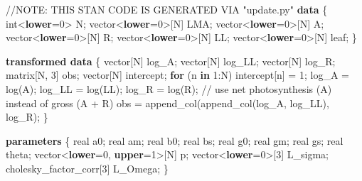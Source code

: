 \documentclass[
  12pt,
  letterpaper,
  DIV=11,
  numbers=noendperiod]{scrartcl}
\newenvironment{Shaded}{\begin{snugshade}}{\end{snugshade}}
\newcommand{\AlertTok}[1]{\textcolor[rgb]{0.68,0.00,0.00}{#1}}
\newcommand{\CommentTok}[1]{\textcolor[rgb]{0.37,0.37,0.37}{#1}}
\newcommand{\ControlFlowTok}[1]{\textcolor[rgb]{0.00,0.23,0.31}{\textbf{#1}}}
\newcommand{\DataTypeTok}[1]{\textcolor[rgb]{0.68,0.00,0.00}{#1}}
\newcommand{\DecValTok}[1]{\textcolor[rgb]{0.68,0.00,0.00}{#1}}
\newcommand{\KeywordTok}[1]{\textcolor[rgb]{0.00,0.23,0.31}{\textbf{#1}}}
\newcommand{\NormalTok}[1]{\textcolor[rgb]{0.00,0.23,0.31}{#1}}
\numberwithin{equation}{section}
\begin{document}
\begin{Shaded}
\begin{Highlighting}[]
\CommentTok{//}\AlertTok{NOTE}\CommentTok{: THIS STAN CODE IS GENERATED VIA "update.py"}
\KeywordTok{data}\NormalTok{ \{}
  \DataTypeTok{int}\NormalTok{\textless{}}\KeywordTok{lower}\NormalTok{=}\DecValTok{0}\NormalTok{\textgreater{} N;}
  \DataTypeTok{vector}\NormalTok{\textless{}}\KeywordTok{lower}\NormalTok{=}\DecValTok{0}\NormalTok{\textgreater{}[N] LMA;}
  \DataTypeTok{vector}\NormalTok{\textless{}}\KeywordTok{lower}\NormalTok{=}\DecValTok{0}\NormalTok{\textgreater{}[N] A;}
  \DataTypeTok{vector}\NormalTok{\textless{}}\KeywordTok{lower}\NormalTok{=}\DecValTok{0}\NormalTok{\textgreater{}[N] R;}
  \DataTypeTok{vector}\NormalTok{\textless{}}\KeywordTok{lower}\NormalTok{=}\DecValTok{0}\NormalTok{\textgreater{}[N] LL;}
  \DataTypeTok{vector}\NormalTok{\textless{}}\KeywordTok{lower}\NormalTok{=}\DecValTok{0}\NormalTok{\textgreater{}[N] leaf;}
\NormalTok{\}}

\KeywordTok{transformed data}\NormalTok{ \{}
  \DataTypeTok{vector}\NormalTok{[N] log\_A;}
  \DataTypeTok{vector}\NormalTok{[N] log\_LL;}
  \DataTypeTok{vector}\NormalTok{[N] log\_R;}
  \DataTypeTok{matrix}\NormalTok{[N, }\DecValTok{3}\NormalTok{] obs;}
  \DataTypeTok{vector}\NormalTok{[N] intercept;}
  \ControlFlowTok{for}\NormalTok{ (n }\ControlFlowTok{in} \DecValTok{1}\NormalTok{:N)}
\NormalTok{    intercept[n] = }\DecValTok{1}\NormalTok{;}
\NormalTok{  log\_A = log(A);}
\NormalTok{  log\_LL = log(LL);}
\NormalTok{  log\_R = log(R);}
  \CommentTok{// use net photosynthesis (A) instead of gross (A + R)}
\NormalTok{  obs = append\_col(append\_col(log\_A, log\_LL), log\_R);}
\NormalTok{\}}

\KeywordTok{parameters}\NormalTok{ \{}
  \DataTypeTok{real}\NormalTok{ a0;}
  \DataTypeTok{real}\NormalTok{ am;}
  \DataTypeTok{real}\NormalTok{ b0;}
  \DataTypeTok{real}\NormalTok{ bs;}
  \DataTypeTok{real}\NormalTok{ g0;}
  \DataTypeTok{real}\NormalTok{ gm;}
  \DataTypeTok{real}\NormalTok{ gs;}
  \DataTypeTok{real}\NormalTok{ theta;}
  \DataTypeTok{vector}\NormalTok{\textless{}}\KeywordTok{lower}\NormalTok{=}\DecValTok{0}\NormalTok{, }\KeywordTok{upper}\NormalTok{=}\DecValTok{1}\NormalTok{\textgreater{}[N] p;}
  \DataTypeTok{vector}\NormalTok{\textless{}}\KeywordTok{lower}\NormalTok{=}\DecValTok{0}\NormalTok{\textgreater{}[}\DecValTok{3}\NormalTok{] L\_sigma;}
  \DataTypeTok{cholesky\_factor\_corr}\NormalTok{[}\DecValTok{3}\NormalTok{] L\_Omega;}
\NormalTok{\}}


\end{Highlighting}
\end{Shaded}
\end{document}
